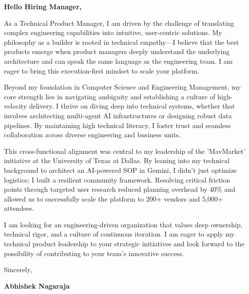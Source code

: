 \documentclass[11pt,letterpaper]{article} %
\begin{document}
\vspace{1.5em}

\textbf{Hello Hiring Manager,}

As a Technical Product Manager, I am driven by the challenge of translating complex engineering capabilities into intuitive, user-centric solutions. My philosophy as a builder is rooted in technical empathy—I believe that the best products emerge when product managers deeply understand the underlying architecture and can speak the same language as the engineering team. I am eager to bring this execution-first mindset to scale your platform.

Beyond my foundation in Computer Science and Engineering Management, my core strength lies in navigating ambiguity and establishing a culture of high-velocity delivery. I thrive on diving deep into technical systems, whether that involves architecting multi-agent AI infrastructures or designing robust data pipelines. By maintaining high technical literacy, I foster trust and seamless collaboration across diverse engineering and business units.

This cross-functional alignment was central to my leadership of the 'MavMarket' initiative at the University of Texas at Dallas. By leaning into my technical background to architect an AI-powered SOP in Gemini, I didn't just optimize logistics; I built a resilient community framework. Resolving critical friction points through targeted user research reduced planning overhead by 40\% and allowed us to successfully scale the platform to 200+ vendors and 5,000+ attendees.

I am looking for an engineering-driven organization that values deep ownership, technical rigor, and a culture of continuous iteration. I am eager to apply my technical product leadership to your strategic initiatives and look forward to the possibility of contributing to your team's innovative success.

\vspace{1.5em}
Sincerely,

\vspace{1.2em} %
\textbf{Abhishek Nagaraja}
\end{document}
